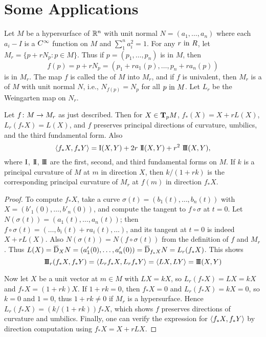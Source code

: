 \documentclass[../main]{subfiles}
\begin{document}
\section{Some Applications}\label{ch02:s6}

Let $M$ be a hypersurface of $\bR^n$ with unit normal $N = (a_1,\dots,a_n)$ where each $a_i-I$ is a $\CInfty$ function on $M$ and $\sum_1^n a_i^2 = 1$. For any $r \InText R$, let\newline $M_r = \{p+rN_p \colon p\in M\}$. Thus if $p = (p_1,\dots,p_n)$ is in $M$, then \[f(p) = p+rN_p = (p_1 + ra_1(p),\dots,p_n + ra_n(p))\] is in $M_r$. The map $f$ is called the  of $M$ into $M_r$, and if $f$ is univalent, then $M_r$ is a  of $M$ with unit normal $N$, i.e., $N_{f(p)} = N_p$ for all $p\InText M$. Let $L_r$ be the Weingarten map on $N_r$. 



\begin{theorem} \label{thm:ch2.6.1}
Let $f\colon M \functionMaps M_r$ as just described. Then for $X \in \tangentspace{M}{p}$, \newline $f_*(X) = X + rL(X)$, $L_r(f_*X) = L(X)$, and $f$ preserves principal directions of curvature, umbilics, and the third fundamental form. Also
\[ \ip{f_*X}{f_*Y} = \firstForm(X, Y) + 2r\ \secondForm(X, Y) + r^2\ \thirdForm(X,Y), \]
where $\firstForm$, $\secondForm$, $\thirdForm$ are the first, second, and third fundamental forms on $M$. If $k$ is a principal curvature of $M$ at $m$ in direction $X$, then $k/(1+rk)$ is the corresponding principal curvature of $M_r$ at $f(m)$ in direction $f_*X$.
\end{theorem} 

\begin{proof}
To compute $f_*X$, take a curve $\sigma(t) = (b_1(t),\dots, b_n(t))$ with \\ $X = (b'_1(0), \dots, b'_n(0))$, and compute the tangent to $f\circ \sigma$ at $t=0$. Let \newline $N(\sigma(t)) = (a_1(t), \dots, a_n(t))$; then $f\circ \sigma(t) = (\dots, b_i(t) + ra_i(t), \dots)$, and its tangent at $t=0$ is indeed $X + rL(X)$. Also $N(\sigma(t)) = N(f\circ \sigma(t))$ from the definition of $f$ and $M_r$. Thus $L(X) = \covariant_XN = (a'_1(0),\dots,a'_n(0)) = \covariant_{f_*X}N=L_r(f_*X)$. This shows
\[ \thirdForm_r(f_*X, f_*Y) = \ip{L_rf_*X}{L_rf_*Y} = \ip{LX}{LY} = \thirdForm(X,Y) \]

Now let $X$ be a unit vector at $m \in M$ with $LX = kX$, so \newline $L_r(f_*X) = LX = kX$ and $f_*X = (1+rk)X$. If $1+rk = 0$, then \newline $f_*X= 0$ and $L_r(f_*X) = kX = 0$, so $k=0$ and $1=0$, thus $1+rk\ne 0$ if $M_r$ is a hypersurface. Hence $L_r(f_*X) = (k/(1+rk))f_*X$, which shows $f$ preserves directions of curvature and umbilics. Finally, one can verify the expression for $\ip{f_*X}{f_*Y}$ by direction computation using $f_*X = X + rLX$. 
\end{proof}
\end{document}
